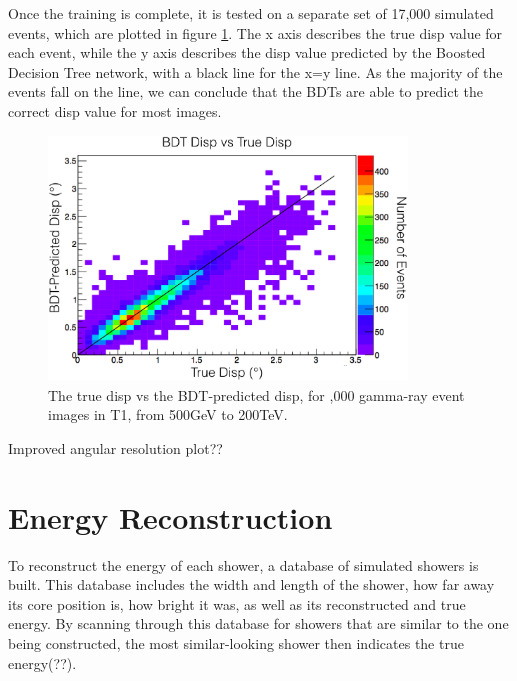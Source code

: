 Once the training is complete, it is tested on a separate set of 17,000 simulated events, which are plotted in figure \ref{fig:disptraining}.
The x axis describes the true disp value for each event, while the y axis describes the disp value predicted by the Boosted Decision Tree network, with a black line for the x=y line.
As the majority of the events fall on the line, we can conclude that the BDTs are able to predict the correct disp value for most images.

\begin{figure}[ht]
  \begin{center}
    \includegraphics[width=0.85\textwidth]{images/disp_training.eps}
    \caption[Disp BDT Training]{The true disp vs the BDT-predicted disp, for ,000 gamma-ray event images in T1, from 500GeV to 200TeV.}\label{fig:disptraining}
  \end{center}
\end{figure}

Improved angular resolution plot??

\section{Energy Reconstruction}\label{subsec:enrecon}
To reconstruct the energy of each shower, a database of simulated showers is built.
This database includes the width and length of the shower, how far away its core position is, how bright it was, as well as its reconstructed and true energy.
By scanning through this database for showers that are similar to the one being constructed, the most similar-looking shower then indicates the true energy(??).



